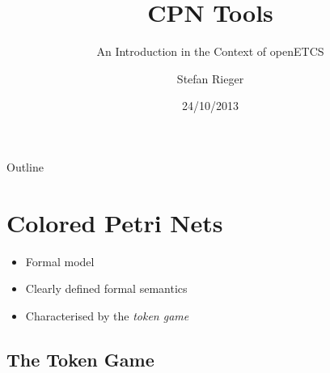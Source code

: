 \documentclass{beamer}
\title{CPN Tools}
\subtitle{An Introduction in the Context of openETCS}
\author{Stefan Rieger}
\institute{TWT GmbH Science \& Innovation\\~\\Stuttgart, Germany}
\date{24/10/2013}
\begin{document}
\begin{frame}[plain]
  \titlepage
\end{frame}

\begin{frame}{Outline}
  \tableofcontents
\end{frame}

\section{Colored Petri Nets}

\begin{frame}
\begin{itemize}
  \item Formal model
  \item Clearly defined formal semantics
  \item Characterised by the \emph{token game}
\end{itemize}
\end{frame}

\subsection{The Token Game}
\end{document}
